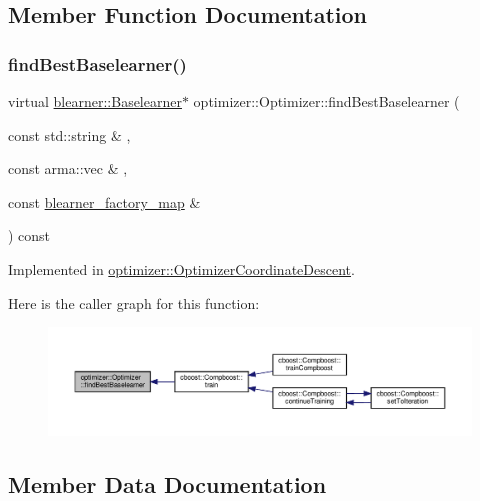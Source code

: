 \subsection{Member Function Documentation}
\mbox{\label{classoptimizer_1_1_optimizer_a134c7b34ed868231fbab53e9ebfa8fd8}} 
\subsubsection{\texorpdfstring{find\+Best\+Baselearner()}{findBestBaselearner()}}
{\footnotesize\ttfamily virtual \hyperlink{classblearner_1_1_baselearner}{blearner\+::\+Baselearner}$\ast$ optimizer\+::\+Optimizer\+::find\+Best\+Baselearner (\begin{DoxyParamCaption}\item[{const std\+::string \&}]{,  }\item[{const arma\+::vec \&}]{,  }\item[{const \hyperlink{baselearner__factory__list_8h_a058570e00ae11b882cfed36eb40be025}{blearner\+\_\+factory\+\_\+map} \&}]{ }\end{DoxyParamCaption}) const\hspace{0.3cm}{\ttfamily [pure virtual]}}



Implemented in \hyperlink{classoptimizer_1_1_optimizer_coordinate_descent_af657f2f5f702bddab8c640368704d18c}{optimizer\+::\+Optimizer\+Coordinate\+Descent}.

Here is the caller graph for this function\+:
\nopagebreak
\begin{figure}[H]
\begin{center}
\leavevmode
\includegraphics[width=350pt]{classoptimizer_1_1_optimizer_a134c7b34ed868231fbab53e9ebfa8fd8_icgraph}
\end{center}
\end{figure}


\subsection{Member Data Documentation}
\mbox{\label{classoptimizer_1_1_optimizer_a93f8af0ef81986bc208cab5e3cc2ba31}} 
